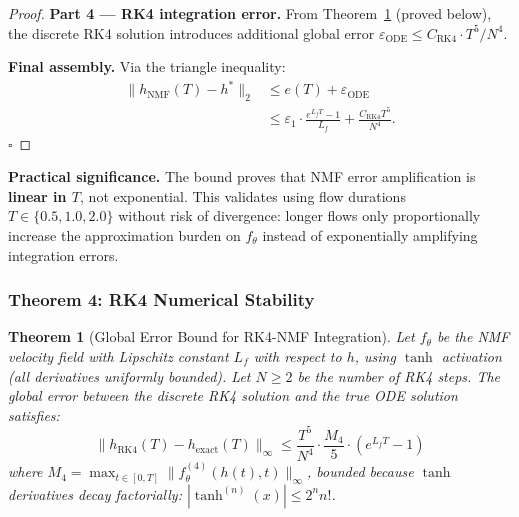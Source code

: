 \documentclass[conference]{IEEEtran}
\newtheorem{theorem}{Theorem}[section]
\begin{document}
\begin{proof}
\textbf{Part 4 --- RK4 integration error.}
From Theorem~\ref{thm:nmf-rk4} (proved below), the discrete RK4 solution introduces additional global error $\varepsilon_{\text{ODE}} \leq C_{\text{RK4}} \cdot T^5 / N^4$.

\textbf{Final assembly.}
Via the triangle inequality:
\begin{align}
\|h_{\text{NMF}}(T) - h^*\|_2 &\leq e(T) + \varepsilon_{\text{ODE}} \\
&\leq \varepsilon_1 \cdot \frac{e^{L_f T} - 1}{L_f} + \frac{C_{\text{RK4}} T^5}{N^4}.
\end{align}
$\square$
\end{proof}

\textbf{Practical significance.} The bound proves that NMF error amplification is \textbf{linear in $T$}, not exponential. This validates using flow durations $T \in \{0.5, 1.0, 2.0\}$ without risk of divergence: longer flows only proportionally increase the approximation burden on $f_\theta$ instead of exponentially amplifying integration errors.

\subsubsection{Theorem 4: RK4 Numerical Stability}

\begin{theorem}[Global Error Bound for RK4-NMF Integration]
\label{thm:nmf-rk4}
Let $f_\theta$ be the NMF velocity field with Lipschitz constant $L_f$ with respect to $h$, using $\tanh$ activation (all derivatives uniformly bounded). Let $N \geq 2$ be the number of RK4 steps. The global error between the discrete RK4 solution and the true ODE solution satisfies:
\begin{equation}
\|h_{\text{RK4}}(T) - h_{\text{exact}}(T)\|_\infty \leq \frac{T^5}{N^4} \cdot \frac{M_4}{5} \cdot (e^{L_f T} - 1)
\end{equation}
where $M_4 = \max_{t \in [0,T]} \|f_\theta^{(4)}(h(t), t)\|_\infty$, bounded because $\tanh$ derivatives decay factorially: $|\tanh^{(n)}(x)| \leq 2^n n!$.
\end{theorem}
\end{document}
